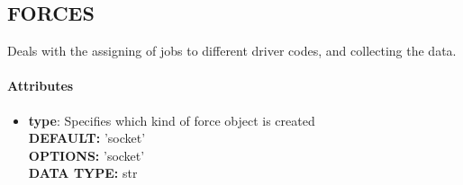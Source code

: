 \subsection{FORCES}
\label{FORCES}
Deals with the assigning of jobs to different driver codes, and collecting the data.
\paragraph{Attributes}
 \begin{itemize}
\item {\bf type}:
 Specifies which kind of force object is created
{\\ \bf DEFAULT: }'socket'
{\\ \bf OPTIONS: }'socket'
{\\ \bf DATA TYPE: }str
\end{itemize}
 

